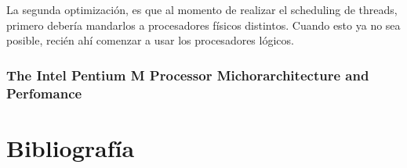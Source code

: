 La segunda optimización, es que al momento de realizar el scheduling de threads, primero debería mandarlos a procesadores físicos distintos. Cuando esto ya no sea posible, recién ahí comenzar a usar los procesadores lógicos.

\newpage
\section{The Intel Pentium M Processor Michorarchitecture and Perfomance}
\newpage
\part*{Bibliografía}
\nocite{*}
\printbibliography[keyword=intro,title={Introduccion}]
\printbibliography[keyword=ilp,title={Instruction Level Paralellism}]
\printbibliography[keyword=memory,title={Jerarquías de memoria}]
\printbibliography[keyword=intel,title={Procesadores Intel}]


